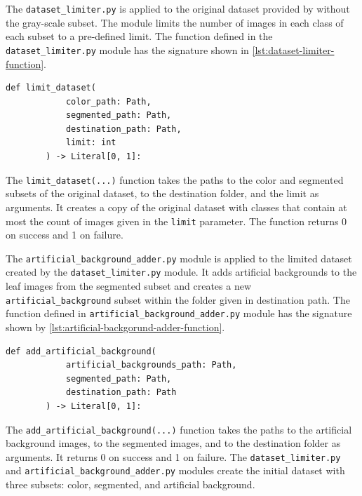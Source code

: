 \documentclass{BachelorBUI}
\begin{document}
        The \verb|dataset_limiter.py| is applied to the original dataset provided by \textcite{Mohanty:2016} without the gray-scale subset. The module limits the number of images in each class of each subset to a pre-defined limit. The function defined in the \verb|dataset_limiter.py| module has the signature shown in \autoref{lst:dataset-limiter-function}.
        \begin{lstlisting}[caption={\centering Signature of the function defined in dataset\_limiter.py}, label={lst:dataset-limiter-function}, captionpos=b]
        def limit_dataset(
            color_path: Path,
            segmented_path: Path,
            destination_path: Path,
            limit: int
        ) -> Literal[0, 1]:
        \end{lstlisting}
        The \verb|limit_dataset(...)| function takes the paths to the color and segmented subsets of the original dataset, to the destination folder, and the limit as arguments. It creates a copy of the original dataset with classes that contain at most the count of images given in the \verb|limit| parameter. The function returns 0 on success and 1 on failure.

        The \verb|artificial_background_adder.py| module is applied to the limited dataset created by the \verb|dataset_limiter.py| module. It adds artificial backgrounds to the leaf images from the segmented subset and creates a new \verb|artificial_background| subset within the folder given in destination path. The function defined in \verb|artificial_background_adder.py| module has the signature shown by \autoref{lst:artificial-backgorund-adder-function}.
        \begin{lstlisting}[caption={\centering Signature of the function defined in artificial\_background\_adder.py}, label={lst:artificial-backgorund-adder-function}, captionpos=b]
        def add_artificial_background(
            artificial_backgrounds_path: Path,
            segmented_path: Path,
            destination_path: Path
        ) -> Literal[0, 1]:
        \end{lstlisting}
        The \verb|add_artificial_background(...)| function takes the paths to the artificial background images, to the segmented images, and to the destination folder as arguments. It returns 0 on success and 1 on failure. The \verb|dataset_limiter.py| and \verb|artificial_background_adder.py| modules create the initial dataset with three subsets: color, segmented, and artificial background.
\end{document}
